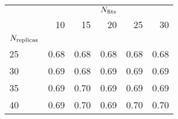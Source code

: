 \begin{center}
    \begin{tabular}{lrrrrr}
        \toprule
        {} & \multicolumn{5}{c}{$N_{\rm fits}$} \\
        {} &   10 &   15 &   20 &   25 &   30 \\
        $N_{\rm replicas}$ &      &      &      &      &      \\
        \midrule
        25            & 0.68 & 0.68 & 0.68 & 0.68 & 0.68 \\
        30            & 0.69 & 0.68 & 0.69 & 0.69 & 0.69 \\
        35            & 0.69 & 0.70 & 0.69 & 0.69 & 0.69 \\
        40            & 0.69 & 0.70 & 0.69 & 0.70 & 0.70 \\
        \bottomrule
        \end{tabular}
\end{center}
